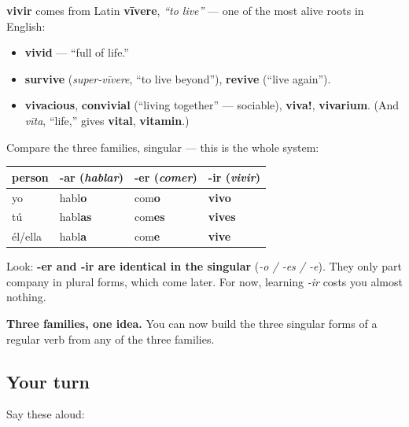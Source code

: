 \begin{cousinweb}
\textbf{vivir} comes from Latin \textbf{vīvere}, \emph{\textquotedblleft{}to live\textquotedblright{}} — one of the most alive roots in English:

\begin{itemize}
\raggedright
  \item \textbf{vivid} — \textquotedblleft{}full of life.\textquotedblright{}
  \item \textbf{survive} (\emph{super-vīvere}, \textquotedblleft{}to live beyond\textquotedblright{}), \textbf{revive} (\textquotedblleft{}live again\textquotedblright{}).
  \item \textbf{vivacious}, \textbf{convivial} (\textquotedblleft{}living together\textquotedblright{} — sociable), \textbf{viva!}, \textbf{vivarium}. (And \emph{vīta}, \textquotedblleft{}life,\textquotedblright{} gives \textbf{vital}, \textbf{vitamin}.)
\end{itemize}
\end{cousinweb}

\begin{grammarlens}[title={Grammar Lens: the -ir present tense}]
Compare the three families, singular — this is the whole system:

\noindent
\begin{tabularx}{\linewidth}{@{}>{\raggedright\arraybackslash}X>{\raggedright\arraybackslash}X>{\raggedright\arraybackslash}X>{\raggedright\arraybackslash}X@{}}
\toprule
\textbf{person} & \textbf{-ar (\emph{hablar})} & \textbf{-er (\emph{comer})} & \textbf{\textbf{-ir} (\emph{vivir})} \\
\midrule
yo & habl\textbf{o} & com\textbf{o} & \textbf{vivo} \\
tú & habl\textbf{as} & com\textbf{es} & \textbf{vives} \\
él/ella & habl\textbf{a} & com\textbf{e} & \textbf{vive} \\
\bottomrule
\end{tabularx}

Look: \textbf{-er and -ir are identical in the singular} (\emph{-o / -es / -e}). They only part company in plural forms, which come later. For now, learning \emph{-ir} costs you almost nothing.

\textbf{Three families, one idea.} You can now build the three singular forms of a regular verb from any of the three families.
\end{grammarlens}

\subsection*{Your turn}
Say these aloud:

